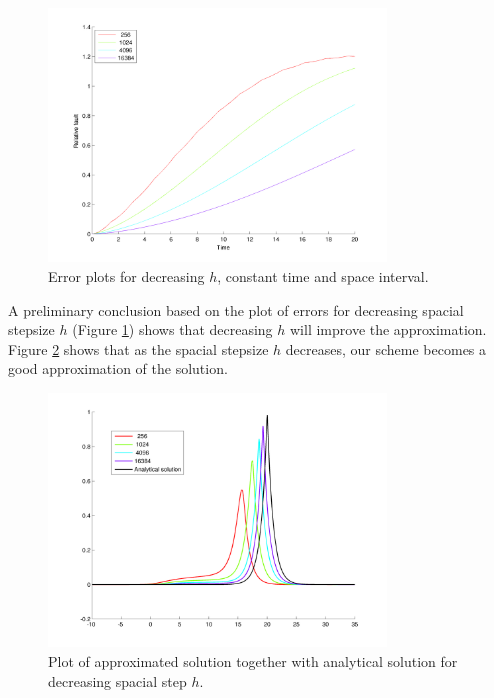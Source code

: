 \begin{figure}[h]
        \centering
        \includegraphics[width=0.8\textwidth]{gfx/erroroftime}
        \caption{Error plots for decreasing $h$, constant time and space interval.}
        \label{fig:erroroftime}
\end{figure}
A preliminary conclusion based on the plot of errors for decreasing spacial stepsize $h$ (Figure \ref{fig:erroroftime}) shows that decreasing $h$ will improve the approximation. Figure \ref{fig:attimeT} shows that as the spacial stepsize $h$ decreases, our scheme becomes a good approximation of the solution. \\

\begin{figure}[h]
        \centering
        \includegraphics[width=0.8\textwidth]{gfx/attimeT}
        \caption{Plot of approximated solution together with analytical solution for decreasing spacial step $h$.}
        \label{fig:attimeT}
\end{figure}

